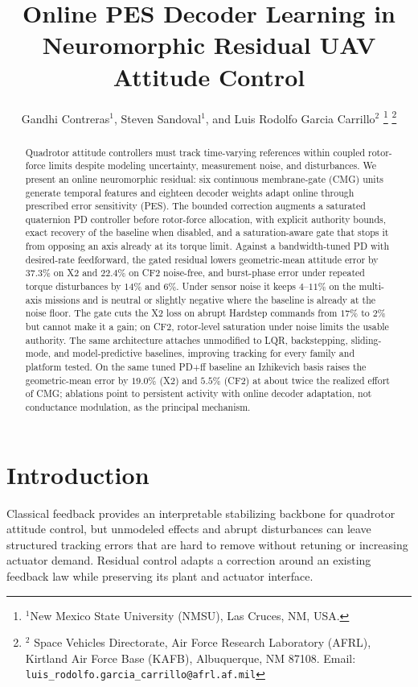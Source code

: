 \documentclass[letterpaper, 10 pt, conference]{ieeeconf}
\title{\LARGE \bf Online PES Decoder Learning in Neuromorphic Residual UAV Attitude Control}
\author{Gandhi Contreras$^{1}$, Steven Sandoval$^{1}$, and Luis Rodolfo Garcia Carrillo$^{2}$%
\thanks{$^{1}$New Mexico State University (NMSU), Las Cruces, NM, USA.}%
\thanks{$^{2}$ Space Vehicles Directorate, Air Force Research Laboratory (AFRL), Kirtland Air Force Base (KAFB), Albuquerque, NM 87108.
    Email: {\tt\small luis\_rodolfo.garcia\_carrillo@afrl.af.mil}}%
}
\begin{document}
\maketitle



\begin{abstract}
Quadrotor attitude controllers must track time-varying references within coupled rotor-force limits despite modeling uncertainty, measurement noise, and disturbances. We present an online neuromorphic residual: six continuous membrane-gate (CMG) units generate temporal features and eighteen decoder weights adapt online through prescribed error sensitivity (PES). The bounded correction augments a saturated quaternion PD controller before rotor-force allocation, with explicit authority bounds, exact recovery of the baseline when disabled, and a saturation-aware gate that stops it from opposing an axis already at its torque limit. Against a bandwidth-tuned PD with desired-rate feedforward, the gated residual lowers geometric-mean attitude error by $37.3\%$ on X2 and $22.4\%$ on CF2 noise-free, and burst-phase error under repeated torque disturbances by $14\%$ and $6\%$. Under sensor noise it keeps $4$--$11\%$ on the multi-axis missions and is neutral or slightly negative where the baseline is already at the noise floor. The gate cuts the X2 loss on abrupt Hardstep commands from $17\%$ to $2\%$ but cannot make it a gain; on CF2, rotor-level saturation under noise limits the usable authority. The same architecture attaches unmodified to LQR, backstepping, sliding-mode, and model-predictive baselines, improving tracking for every family and platform tested. On the same tuned PD+ff baseline an Izhikevich basis raises the geometric-mean error by $19.0\%$ (X2) and $5.5\%$ (CF2) at about twice the realized effort of CMG; ablations point to persistent activity with online decoder adaptation, not conductance modulation, as the principal mechanism.
\end{abstract}

\section{Introduction}
Classical feedback provides an interpretable stabilizing backbone for quadrotor attitude control, but unmodeled effects and abrupt disturbances can leave structured tracking errors that are hard to remove without retuning or increasing actuator demand. Residual control adapts a correction around an existing feedback law while preserving its plant and actuator interface.
\end{document}
